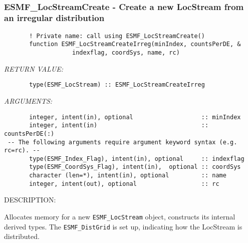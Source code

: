  
\mbox{}\hrulefill\ 
 
\subsubsection [ESMF\_LocStreamCreate] {ESMF\_LocStreamCreate - Create a new LocStream from an irregular distribution}


 
\begin{verbatim}       ! Private name: call using ESMF_LocStreamCreate()
       function ESMF_LocStreamCreateIrreg(minIndex, countsPerDE, &
                   indexflag, coordSys, name, rc)\end{verbatim}{\em RETURN VALUE:}
\begin{verbatim}       type(ESMF_LocStream) :: ESMF_LocStreamCreateIrreg
 \end{verbatim}{\em ARGUMENTS:}
\begin{verbatim}       integer, intent(in), optional                   :: minIndex
       integer, intent(in)                             :: countsPerDE(:)
 -- The following arguments require argument keyword syntax (e.g. rc=rc). --
       type(ESMF_Index_Flag), intent(in), optional     :: indexflag
       type(ESMF_CoordSys_Flag), intent(in),  optional :: coordSys
       character (len=*), intent(in), optional         :: name
       integer, intent(out), optional                  :: rc\end{verbatim}
{\sf DESCRIPTION:\\ }


       Allocates memory for a new {\tt ESMF\_LocStream} object, constructs its
       internal derived types.  The {\tt ESMF\_DistGrid} is set up, indicating
       how the LocStream is distributed. 
  
